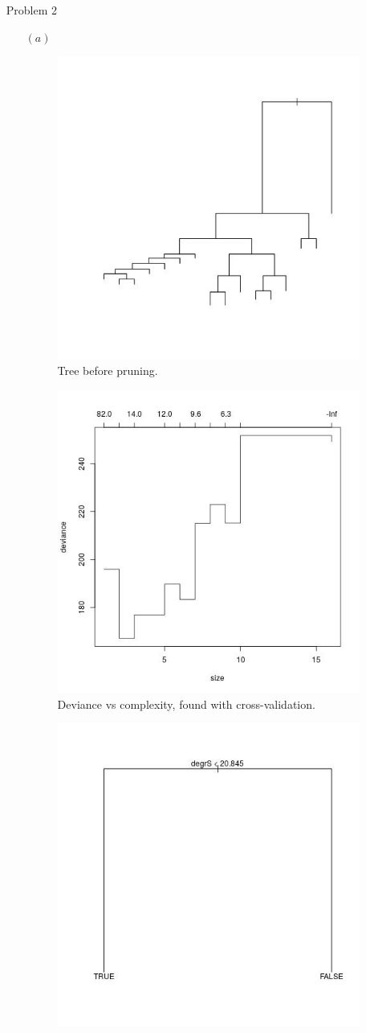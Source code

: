 \documentclass[a4paper, 10pt, english]{article}
\begin{document}
\begin{itemize}
\vspace{0.5cm}
\item [Problem 2]

    \begin{enumerate}
	\vspace{0.5cm}
	\item[$(a)$] 
	    \begin{figure}[H]
		\centering
		\includegraphics[width=0.6\linewidth]{r-script/plots/unpruned-tree.jpg}
		\caption{Tree before pruning.}
		\label{fig:tree1}
	    \end{figure}
	    \begin{figure}[H]
		\centering
		\includegraphics[width=0.6\linewidth]{r-script/plots/deviance.jpg}
		\caption{Deviance vs complexity, found with cross-validation.}
		\label{fig:dev1}
	    \end{figure}
	    \begin{figure}[H]
		\centering
		\includegraphics[width=0.6\linewidth]{r-script/plots/tree2.jpg}

\end{figure}
\end{enumerate}
\end{itemize}
\end{document}
